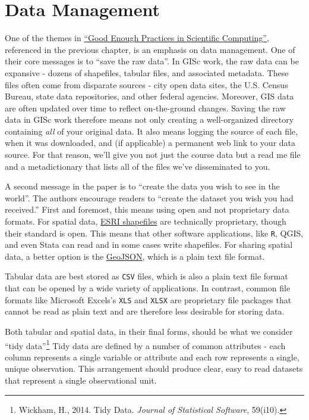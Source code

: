 \documentclass[]{book}
\let\rmarkdownfootnote\footnote%
\def\footnote{\protect\rmarkdownfootnote}
\theoremstyle{definition}
\theoremstyle{definition}
\theoremstyle{definition}
\theoremstyle{remark}
\begin{document}
\section{Data Management}\label{data-management}

One of the themes in \href{https://arxiv.org/abs/1609.00037}{``Good
Enough Practices in Scientific Computing''}, referenced in the previous
chapter, is an emphasis on data management. One of their core messages
is to ``save the raw data''. In GISc work, the raw data can be expansive
- dozens of shapefiles, tabular files, and associated metadata. These
files often come from disparate sources - city open data sites, the U.S.
Census Bureau, state data repositories, and other federal agencies.
Moreover, GIS data are often updated over time to reflect on-the-ground
changes. Saving the raw data in GISc work therefore means not only
creating a well-organized directory containing \emph{all} of your
original data. It also means logging the source of each file, when it
was downloaded, and (if applicable) a permanent web link to your data
source. For that reason, we'll give you not just the course data but a
read me file and a metadictionary that lists all of the files we've
disseminated to you.

A second message in the paper is to ``create the data you wish to see in
the world''. The authors encourage readers to ``create the dataset you
wish you had received.'' First and foremost, this means using open and
not proprietary data formats. For spatial data,
\href{https://en.wikipedia.org/wiki/Shapefile}{ESRI shapefiles} are
technically proprietary, though their standard is open. This means that
other software applications, like \texttt{R}, QGIS, and even Stata can
read and in some cases write shapefiles. For sharing spatial data, a
better option is the
\href{https://en.wikipedia.org/wiki/GeoJSON}{GeoJSON}, which is a plain
text file format.

Tabular data are best stored as \texttt{CSV} files, which is also a
plain text file format that can be opened by a wide variety of
applications. In contrast, common file formats like Microsoft Excels's
\texttt{XLS} and \texttt{XLSX} are proprietary file packages that cannot
be read as plain text and are therefore less desirable for storing data.

Both tabular and spatial data, in their final forms, should be what we
consider ``tidy data''\footnote{Wickham, H., 2014. Tidy Data.
  \emph{Journal of Statistical Software}, 59(i10).} Tidy data are
defined by a number of common attributes - each column represents a
single variable or attribute and each row represents a single, unique
observation. This arrangement should produce clear, easy to read
datasets that represent a single observational unit.
\end{document}
